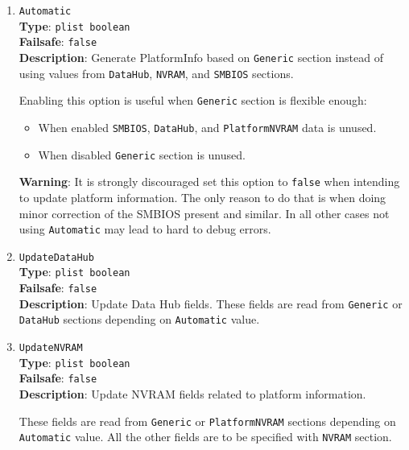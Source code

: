 \documentclass[]{article}
\providecommand{\tightlist}{%
  \setlength{\itemsep}{0pt}\setlength{\parskip}{0pt}}
\begin{document}
\begin{enumerate}
\item
  \texttt{Automatic}\\
  \textbf{Type}: \texttt{plist\ boolean}\\
  \textbf{Failsafe}: \texttt{false}\\
  \textbf{Description}: Generate PlatformInfo based on \texttt{Generic}
  section instead of using values from \texttt{DataHub}, \texttt{NVRAM},
  and \texttt{SMBIOS} sections.

  Enabling this option is useful when \texttt{Generic} section is flexible
  enough:
  \begin{itemize}
  \tightlist
  \item When enabled \texttt{SMBIOS}, \texttt{DataHub}, and
  \texttt{PlatformNVRAM} data is unused.
  \item When disabled \texttt{Generic} section is unused.
  \end{itemize}

  \textbf{Warning}: It is strongly discouraged set this option to \texttt{false}
  when intending to update platform information. The only reason to do that is
  when doing minor correction of the SMBIOS present and similar. In all other
  cases not using \texttt{Automatic} may lead to hard to debug errors.

\item
  \texttt{UpdateDataHub}\\
  \textbf{Type}: \texttt{plist\ boolean}\\
  \textbf{Failsafe}: \texttt{false}\\
  \textbf{Description}: Update Data Hub fields. These fields are read
  from \texttt{Generic} or \texttt{DataHub} sections depending on
  \texttt{Automatic} value.
\item
  \texttt{UpdateNVRAM}\\
  \textbf{Type}: \texttt{plist\ boolean}\\
  \textbf{Failsafe}: \texttt{false}\\
  \textbf{Description}: Update NVRAM fields related to platform information.

  These fields are read from \texttt{Generic} or \texttt{PlatformNVRAM} sections
  depending on \texttt{Automatic} value. All the other fields are
  to be specified with \texttt{NVRAM} section.


\end{enumerate}
\end{document}
